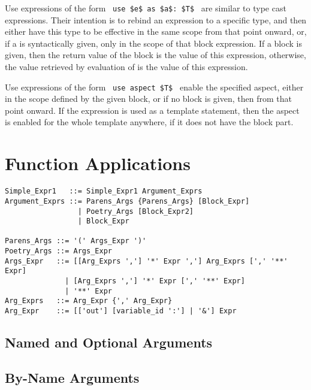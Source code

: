 Use expressions of the form ~\lstinline!use $e$ as $a$: $T$!~ are similar to type cast expressions. Their intention is to rebind an expression to a specific type, and then either have this type to be effective in the same scope from that point onward, or, if a  is syntactically given, only in the scope of that block expression. If a block is given, then the return value of the block is the value of this expression, otherwise, the value retrieved by evaluation of  is the value of this expression. 

Use expressions of the form ~\lstinline!use aspect $T$!~ enable the specified aspect, either in the scope defined by the given block, or if no block is given, then from that point onward. If the expression is used as a template statement, then the aspect is enabled for the whole template anywhere, if it does not have the block part. 








\section{Function Applications}
\label{sec:function-applications}

\syntax\begin{lstlisting}
Simple_Expr1   ::= Simple_Expr1 Argument_Exprs 
Argument_Exprs ::= Parens_Args {Parens_Args} [Block_Expr] 
                 | Poetry_Args [Block_Expr2]
                 | Block_Expr
                 
Parens_Args ::= '(' Args_Expr ')'
Poetry_Args ::= Args_Expr
Args_Expr   ::= [[Arg_Exprs ','] '*' Expr ','] Arg_Exprs [',' '**' Expr]
              | [Arg_Exprs ','] '*' Expr [',' '**' Expr]
              | '**' Expr
Arg_Exprs   ::= Arg_Expr {',' Arg_Expr}
Arg_Expr    ::= [['out'] [variable_id ':'] | '&'] Expr
\end{lstlisting}







\subsection{Named and Optional Arguments}
\label{sec:named-optional-arguments}

\subsection{By-Name Arguments}
\label{sec:by-name-arguments}

